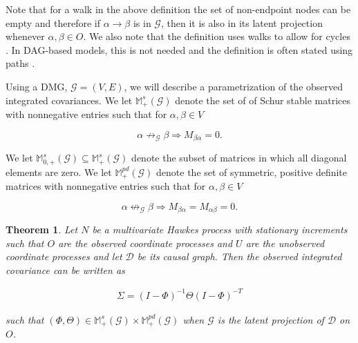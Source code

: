 \documentclass[accepted]{uai2021} %
\newtheorem{thm}{Theorem}
\begin{document}
Note that for a walk in the above definition the set of non-endpoint nodes can 
be empty and therefore if $\alpha\rightarrow\beta$ is in $\mathcal{G}$, then it 
is 
also in its latent projection whenever $\alpha,\beta\in O$. We also note that 
the definition uses walks to 
allow for cycles \citep{mogensen2018}. In DAG-based models, this is 
not needed 
and the definition is often stated using paths 
\citep{richardson2017}.

Using a DMG, $\mathcal{G} = (V,E)$, we will describe a parametrization of the 
observed integrated covariances. We let $\mathbb{M}_+^s(\mathcal{G})$ denote 
the set of of Schur stable matrices with nonnegative entries such that for 
$\alpha,\beta\in V$

$$
\alpha\not\rightarrow_\mathcal{G}\beta \Rightarrow M_{\beta\alpha} = 0.
$$

We let $\mathbb{M}_{0,+}^s(\mathcal{G})\subseteq 
\mathbb{M}_+^s(\mathcal{G})$ denote the subset of matrices in which all 
diagonal 
elements are zero.
We let $\mathbb{M}_+^{pd}(\mathcal{G})$ denote the set of symmetric, positive 
definite matrices with nonnegative entries such that for $\alpha,\beta\in V$

$$
\alpha\not \leftrightarrow_\mathcal{G} \beta \Rightarrow M_{\beta\alpha} = 
M_{\alpha\beta} = 0.
$$

\begin{thm}

	Let $N$ be a multivariate Hawkes process with stationary increments such 
	that $O$ are the 
	observed 
	coordinate processes and $U$ are the unobserved coordinate processes and 
	let $\mathcal{D}$ be its causal graph. Then the observed integrated 
	covariance can be written as
	
	\begin{align}
	\Sigma = (I - \Phi)^{-1} \Theta (I - \Phi)^{-T}
	\label{eq:margThm}
	\end{align}
	

	
	\noindent such that $(\Phi, \Theta) \in \mathbb{M}_+^s(\mathcal{G}) \times 
	\mathbb{M}_+^{pd}(\mathcal{G})$ when $\mathcal{G}$ is the latent projection 
	of $\mathcal{D}$ on $O$.
	
	\label{thm:marg}
\end{thm}
	
\end{document}
